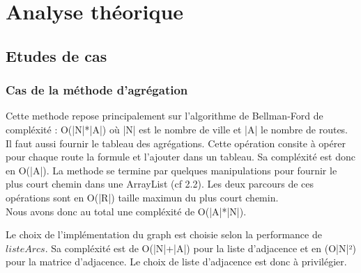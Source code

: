 \chapter{Analyse théorique}

\section{Etudes de cas}
\subsection{Cas de la méthode d'agrégation}

Cette methode repose principalement sur l'algorithme de Bellman-Ford de compléxité : O(|N|*|A|) où |N| est le nombre de ville et |A| le nombre de routes.
Il faut aussi fournir le tableau des agrégations. Cette opération consite à opérer pour chaque route la formule et l'ajouter dans un tableau. Sa compléxité est donc en O(|A|).
La methode se termine par quelques manipulations pour fournir le plus court chemin dans une ArrayList (cf 2.2). Les deux parcours de ces opérations sont en O(|R|) taille maximun du plus court chemin.
\\
Nous avons donc au total une compléxité de O(|A|*|N|).

Le choix de l'implémentation du graph est choisie selon la performance de $listeArcs$. Sa compléxité est de O(|N|+|A|) pour la liste d'adjacence et en (O|N|²) pour la matrice d'adjacence. Le choix de liste d'adjacence est donc à privilégier.


